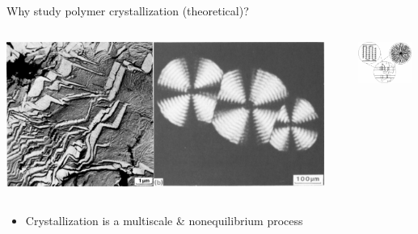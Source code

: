 \documentclass[aspectratio=169]{beamer}
\begin{document}
\begin{frame}[c]{Why study polymer crystallization (theoretical)?}

  \begin{columns}


    \centering
    \includegraphics[width=0.95\textwidth]{figs/pe_crystals.pdf}


    \centering
    \includegraphics[width=0.95\textwidth]{figs/milner2011-fig1.pdf}

  \end{columns}

  \vspace{0.5\baselineskip}

  \begin{columns}[T]


    \centering
    \begin{block}{}
      \begin{itemize}
        \item Crystallization is a multiscale \& nonequilibrium process
      \end{itemize}
    \end{block}


\end{columns}
\end{frame}
\end{document}
